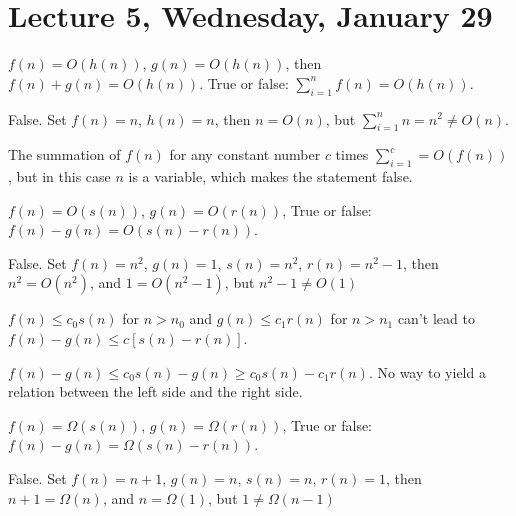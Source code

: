 \section{Lecture 5, Wednesday, January 29}

\begin{prob}

$f(n) = O(h(n))$, $g(n) = O(h(n))$, then $f(n) + g(n) = O (h(n))$. True or false: $\sum_{i = 1}^n f(n) = O(h(n))$.

False. Set $f(n) = n$, $h(n) = n$, then $n = O(n)$, but $\sum_{i = 1}^n n = n^2 \neq O(n)$.

\end{prob}

\begin{remark}

The summation of $f(n)$ for any constant number $c$ times $\sum_{i = 1}^c = O(f(n))$, but in this case $n$ is a variable, which makes the statement false.

\end{remark}

\begin{prob}

$f(n) = O(s(n))$, $g(n) = O(r(n))$, True or false: $f(n) - g(n) = O(s(n) - r(n))$.

False. Set $f(n) = n^2$, $g(n) = 1$, $s(n) = n^2$, $r(n) = n^2 - 1$, then $n^2 = O(n^2)$, and $1 = O(n^2 - 1)$, but $n^2 - 1 \neq O(1)$

\end{prob}

\begin{remark}

$f(n) \leq c_0 s(n)$ for $n > n_0$ and $g(n) \leq c_1 r(n)$ for $n > n_1$ can't lead to $f(n) - g(n) \leq c [s(n) - r(n)]$.

$f(n) - g(n) \leq c_0 s(n) - g(n) \geq c_0 s(n) - c_1 r(n)$. No way to yield a relation between the left side and the right side.

\end{remark}

\begin{prob}

$f(n) = \Omega(s(n))$, $g(n) = \Omega(r(n))$, True or false: $f(n) - g(n) = \Omega(s(n) - r(n))$.

False. Set $f(n) = n + 1$, $g(n) = n$, $s(n) = n$, $r(n) = 1$, then $n + 1 = \Omega(n)$, and $n = \Omega(1)$, but $1 \neq \Omega(n - 1)$

\end{prob}

